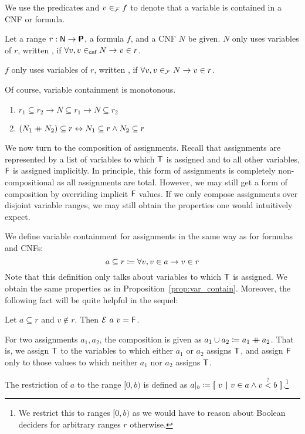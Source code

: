 We use the predicates  and $v \in_{\mathcal{F}} f$ to denote that a variable is contained in a CNF or formula.
\begin{definition}
  Let a range $r : \mathsf{N} \rightarrow \textsf{\bfseries P}$, a formula $f$, and a CNF $N$ be given. 
  $N$ only uses variables of $r$, written , if $\forall v, v \in_{\textsf{cnf}} N \rightarrow v \in r$. 

  $f$ only uses variables of $r$, written , if $\forall v, v \in_{\mathcal{F}} N \rightarrow v \in r$.
\end{definition}

Of course, variable containment is monotonous. 
\begin{proposition}\label{prop:var_contain}\leavevmode
  \begin{enumerate}
    \item $r_1 \subseteq r_2 \rightarrow N \subseteq r_1 \rightarrow N \subseteq r_2$
    \item $(N_1 \mathbin{+\mkern-10mu+} N_2) \subseteq r \leftrightarrow N_1 \subseteq r \land N_2 \subseteq r$
  \end{enumerate}
\end{proposition}

We now turn to the composition of assignments. Recall that assignments are represented by a list of variables to which $\mathsf{T}$ is assigned and to all other variables, $\mathsf{F}$ is assigned implicitly. 
In principle, this form of assignments is completely non-compositional as all assignments are total. 
However, we may still get a form of composition by overriding implicit $\mathsf{F}$ values. If we only compose assignments over disjoint variable ranges, we may still obtain the properties one would intuitively expect. 

We define variable containment  for assignments in the same way as for formulas and CNFs:
\[a \subseteq r \coloneqq \forall v, v \in a \rightarrow v \in r \]
Note that this definition only talks about variables to which $\mathsf{T}$ is assigned.
We obtain the same properties as in Proposition~\ref{prop:var_contain}.
Moreover, the following fact will be quite helpful in the sequel:
\begin{fact}
  Let $a \subseteq r$ and $v \notin r$. Then $\mathcal{E}~a~v = \mathsf{F}$.
\end{fact}

\begin{definition}
  For two assignments $a_1, a_2$, the composition  is given as $a_1 \cup a_2 \coloneqq a_1 \mathbin{+\mkern-10mu+} a_2$. 
  That is, we assign $\mathsf{T}$ to the variables to which either $a_1$ or $a_2$ assigns $\mathsf{T}$, and assign $\mathsf{F}$ only to those values to which neither $a_1$ nor $a_2$ assigns $\mathsf{T}$.

  The restriction of $a$ to the range $[0, b)$ is defined as $a|_b \coloneqq \textbf{[}~ v ~\textbf{|}~ v \in a \land v \overset{?}{<} b ~\textbf{]}$.\footnote{We restrict this to ranges $[0, b)$ as we would have to reason about Boolean deciders for arbitrary ranges $r$ otherwise.} 
\end{definition}

